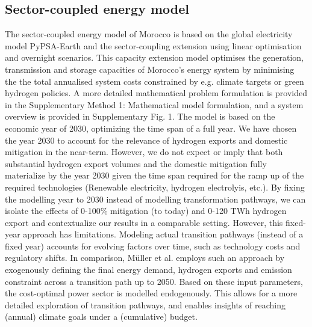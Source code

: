 \subsection*{Sector-coupled energy model}
\label{subsec:moroccan_model}
The sector-coupled energy model of Morocco is based on the global electricity model  PyPSA-Earth \cite{Parzen2023} and the sector-coupling extension \cite{Abdel-Khalek2025} using linear optimisation and overnight scenarios. This capacity extension model optimises the generation, transmission and storage capacities of Morocco's energy system by minimising the the total annualised system costs constrained by e.g. climate targets or green hydrogen policies.
A more detailed mathematical problem formulation is provided in the Supplementary Method 1: Mathematical model formulation,
and a system overview is provided in Supplementary Fig. 1. %
The model is based on the economic year of 2030, optimizing the time span of a full year. We have chosen the year 2030 to account for the relevance of hydrogen exports and domestic \co mitigation in the near-term. However, we do not expect or imply that both substantial hydrogen export volumes and the domestic \co mitigation fully materialize by the year 2030 given the time span required for the ramp up of the required technologies (Renewable electricity, hydrogen electrolyis, etc.). By fixing the modelling year to 2030 instead of modelling transformation pathways, we can isolate the effects of 0-100\% mitigation (to today) and 0-120 TWh hydrogen export and contextualize our results in a comparable setting.
However, this fixed-year approach has limitations. Modeling actual transition pathways (instead of a fixed year) accounts for evolving factors over time, such as technology costs and regulatory shifts. 
In comparison, M\"uller et al.\cite{Muller2024} employs such an  approach by exogenously defining the final energy demand, hydrogen exports and emission constraint across a transition path up to 2050. Based on these input parameters, the cost-optimal power sector is modelled endogenously. This allows for a more detailed exploration of transition pathways, and enables insights of reaching (annual) climate goals under a (cumulative) \co budget.



